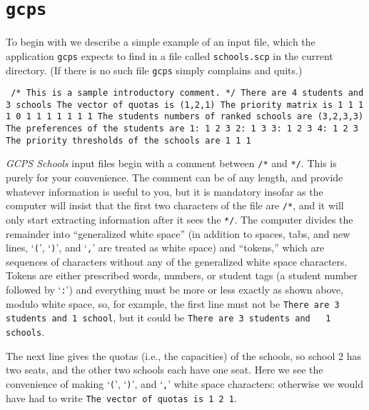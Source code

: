 \documentclass[12pt]{article}
\theoremstyle{definition}
\begin{document}
\section{\texttt{gcps}}

To begin with we describe a simple example of an input file, which the
application \texttt{gcps} expects to find in a file called
\texttt{schools.scp} in the current directory.  (If there is no such
file \texttt{gcps} simply complains and quits.)

\begin{obeylines}\texttt{
/* This is a sample introductory comment. */
There are 4 students and 3 schools
The vector of quotas is (1,2,1)
The priority matrix is
     1     1     1
     1     0     1
     1     1     1
     1     1     1
The students numbers of ranked schools are (3,2,3,3)
The preferences of the students are
1:  1  2  3  
2:  1  3  
3:  1  2  3  
4:  1  2  3  
The priority thresholds of the schools are
1   1   1   
  }
\end{obeylines}

\medskip

\emph{GCPS Schools} input files begin with a comment between
\texttt{/*} and \texttt{*/}.  This is purely for your convenience.
The comment can be of any length, and provide whatever information is
useful to you, but it is mandatory insofar as the computer will insist
that the first two characters of the file are \texttt{/*}, and it will
only start extracting information after it sees the \texttt{*/}.  The
computer divides the remainder into ``generalized white space'' (in
addition to spaces, tabs, and new lines, `\texttt{(}', `\texttt{)}',
and `\texttt{,}' are treated as white space) and ``tokens,'' which are
sequences of characters without any of the generalized white space
characters.  Tokens are either prescribed words, numbers, or student
tags (a student number followed by `\texttt{:}') and everything must
be more or less exactly as shown above, modulo white space, so, for
example, the first line must not be \texttt{There are 3 students and 1
  school}, but it could be \texttt{There are 3 students and \ \ 1
  schools}.

The next line gives the quotas (i.e., the capacities) of the schools,
so school 2 has two seats, and the other two schools each have one
seat.  Here we see the convenience of making `\texttt{(}',
`\texttt{)}', and `\texttt{,}' white space characters: otherwise we
would have had to write \texttt{The vector of quotas is 1 2 1}.
\end{document}
